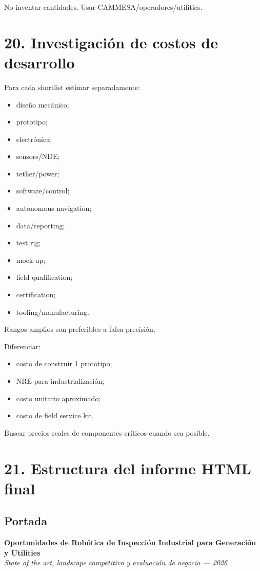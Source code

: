 \documentclass[11pt,a4paper]{article}
\begin{document}
No inventar cantidades. Usar CAMMESA/operadores/utilities.


\section*{20. Investigación de costos de desarrollo}
Para cada shortlist estimar separadamente:

\begin{itemize}
\item diseño mecánico;
\item prototipo;
\item electrónica;
\item sensors/NDE;
\item tether/power;
\item software/control;
\item autonomous navigation;
\item data/reporting;
\item test rig;
\item mock-up;
\item field qualification;
\item certification;
\item tooling/manufacturing.
\end{itemize}

Rangos amplios son preferibles a falsa precisión.

Diferenciar:

\begin{itemize}
\item costo de construir 1 prototipo;
\item NRE para industrialización;
\item costo unitario aproximado;
\item costo de field service kit.
\end{itemize}

Buscar precios reales de componentes críticos cuando sea posible.


\section*{21. Estructura del informe HTML final}

\subsection*{Portada}
\textbf{Oportunidades de Robótica de Inspección Industrial para Generación y Utilities} \\
\emph{State of the art, landscape competitivo y evaluación de negocio — 2026}
\end{document}
